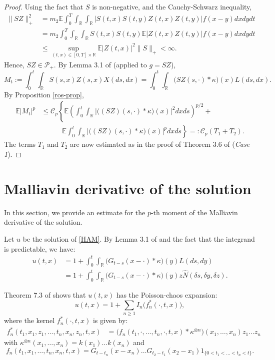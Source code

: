 \documentclass[12pt]{article}
\def\cC{\mathcal{C}}
\def\cP{\mathcal{P}}
\def\bE{\mathbb{E}}
\def\bR{\mathbb{R}}
\def\k{\kappa}
\begin{document}
\begin{proof}
Using the fact that $S$ is non-negative, and the Cauchy-Schwarz inequality,
\begin{align*}
\|SZ\|_{+}^2&=m_2 \bE \int_0^T \int_{\bR} \int_{\bR} |S(t,x)S(t,y)Z(t,x)Z(t,y)|f(x-y)dxdydt\\
& =m_2\int_0^T \int_{\bR} \int_{\bR} S(t,x)S(t,y)\bE|Z(t,x)Z(t,y)|f(x-y)dxdydt \\
& \leq \sup_{(t,x) \in [0,T]\times \bR} \bE|Z(t,x)|^2 \|S\|_{+}<\infty.
\end{align*}
Hence, $SZ \in \cP_{+}$. By Lemma 3.1 of \cite{BJ25} (applied to $g=SZ$),
\[
M_t:=\int_0^t \int_{\bR}S(s,x)Z(s,x)X(ds,dx)=\int_0^t \int_{\bR}\big(SZ(s,\cdot)*\k\big)(x)L(ds,dx).
\]
By Proposition \ref{ros-prop},
\begin{align*}
\bE|M_t|^p & \leq \cC_p  \left\{ \bE \left( \int_0^t \int_{\bR} \big|\big((SZ)(s,\cdot)*\k\big)(x)\big|^2 dx ds \right)^{p/2} + \right. \\
& \quad \quad \quad \left. \bE \int_0^t \int_{\bR}\big|\big((SZ)(s,\cdot)*\k\big)(x)\big|^p dxds\right\}
 =:\cC_p(T_1+T_2).
\end{align*}
The terms $T_1$ and $T_2$ are now estimated as in the proof of Theorem 3.6 of \cite{BJ25} ({\em Case 1}).
\end{proof}

\section{Malliavin derivative of the solution}
\label{section-Mall1}

In this section, we provide an estimate for the $p$-th moment of the Malliavin derivative of the solution.

Let $u$ be the solution of \eqref{HAM}. By Lemma 3.1 of \cite{BJ25} and the fact that the integrand is predictable, we have:
\begin{align*}
u(t,x) &= 1+ \int_0^t \int_{\bR} \big(G_{t-s}(x-\cdot) * \k\big)(y) L(ds,dy) \\
&=1+\int_0^t \int_{\bR} \big(G_{t-s}(x-\cdot) * \k\big)(y) z \widehat{N}(\delta s,\delta y, \delta z).
\end{align*}

Theorem 7.3 of \cite{BJ25} shows that $u(t,x)$ has the Poisson-chaos expansion:
\begin{equation}
\label{chaos-u}
u(t,x)=1+\sum_{n\geq 1}I_n\big(f_n^*(\cdot,t,x)\big),
\end{equation}
where the kernel $f_n^*(\cdot,t,x)$ is given by:
\begin{align*}
f_n^*(t_1,x_1,z_1,\ldots,t_n,x_n,z_n,t,x)& =\big(f_n(t_1,\cdot,\ldots,t_n,\cdot,t,x)* \k^{\otimes n}\big)(x_1,\ldots,x_n)z_1 \ldots z_n 
\end{align*}
with $\k^{\otimes n}(x_1,\ldots,x_n)=k(x_1)\ldots k(x_n)$ and
\begin{equation}
\label{fn-defn}
f_n(t_1,x_1,\ldots,t_n,x_n,t,x)=G_{t-t_n}(x-x_n)\ldots G_{t_2-t_1}(x_2-x_1)1_{\{0<t_1<\ldots<t_n<t\}}.
\end{equation}
\end{document}

